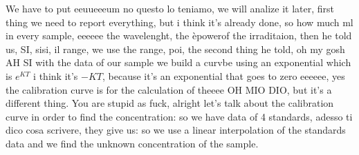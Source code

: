 We have to put eeuueeeum no questo lo teniamo, we will analize it later, first thing we need to report everything, but i think it's already done, so how much ml in every sample, eeeeee the wavelenght, the èpowerof the irraditaion, then he told us, SI, sisi, il range, we  use the range, poi, the second thing he told, oh my gosh AH SI with the data of our sample we build a curvbe using an exponential which is $e^{KT}$ i think it's $-KT$, because it's an exponential that goes to zero eeeeee, yes the calibration curve is for the calculation of theeee OH MIO DIO, but it's a different thing. You are stupid as fuck, alright let's talk about the calibration curve in order to find the concentration: so we have data of 4 standards, adesso ti dico cosa scrivere, they give us: so we use a linear interpolation of the standards data and we find the unknown concentration of the sample. 